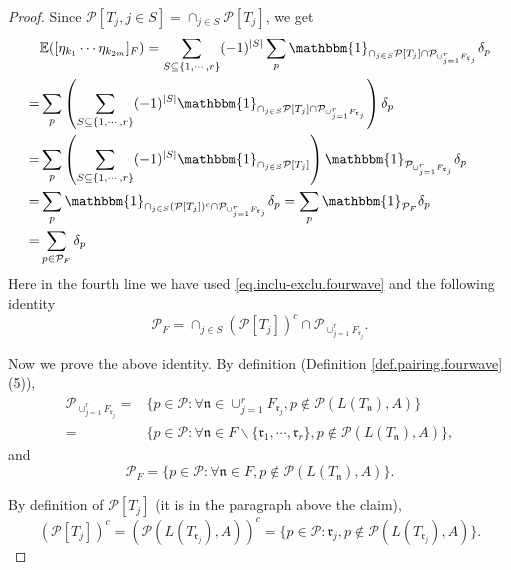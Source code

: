 \begin{proof}
 
 Since $\mathcal{P}[T_j,j\in S]=\cap_{j\in S}\mathcal{P}[T_j]$, we get
 \begin{equation}
  \begin{split}
  &\mathbb{E}([\eta_{k_1}\cdots \eta_{k_{2m}}]_F)=\sum_{S\subseteq\{1,\cdots,r\}}(-1)^{|S|}\sum_{p} \mathbbm{1}_{\cap_{j\in S}\mathcal{P}[T_j]\cap \mathcal{P}_{\cup_{j=1}^r F_{\mathfrak{r}_{j}}}} 
  \delta_p
  \\
  =&\sum_{p} \left(\sum_{S\subseteq\{1,\cdots,r\}}(-1)^{|S|}\mathbbm{1}_{\cap_{j\in S}\mathcal{P}[T_j]\cap \mathcal{P}_{\cup_{j=1}^r F_{\mathfrak{r}_{j}}}} \right)\delta_p 
  \\
  =& \sum_{p} \left(\sum_{S\subseteq\{1,\cdots,r\}}(-1)^{|S|}\mathbbm{1}_{\cap_{j\in S}\mathcal{P}[T_j]} \right)\mathbbm{1}_{ \mathcal{P}_{\cup_{j=1}^r F_{\mathfrak{r}_{j}}}}\delta_p
  \\
  =&\sum_{p} \mathbbm{1}_{\cap_{j\in S}(\mathcal{P}[T_j])^c\cap \mathcal{P}_{\cup_{j=1}^r F_{\mathfrak{r}_{j}}}} 
  \delta_p=\sum_{p} \mathbbm{1}_{\mathcal{P}_F} 
  \delta_p
  \\
  =&\sum_{p\in \mathcal{P}_F} \delta_p
  \end{split}
 \end{equation}
 Here in the fourth line we have used \eqref{eq.inclu-exclu.fourwave} and the following identity
 \begin{equation}\label{eq.lemrenorm5.fourwave}
  \mathcal{P}_F = \cap_{j\in S}(\mathcal{P}[T_j])^c\cap \mathcal{P}_{\cup_{j=1}^r F_{\mathfrak{r}_{j}}}.
 \end{equation}
 
 Now we prove the above identity. By definition (Definition \ref{def.pairing.fourwave} (5)), 
 \begin{equation}
  \begin{split}
  \mathcal{P}_{\cup_{j=1}^r F_{\mathfrak{r}_{j}}}=&\{p\in\mathcal{P}:\forall \mathfrak{n}\in \cup_{j=1}^r F_{\mathfrak{r}_{j}},p\notin \mathcal{P}(L(T_{\mathfrak{n}}),A)\}
  \\
  =&\{p\in\mathcal{P}:\forall \mathfrak{n}\in F\backslash \{\mathfrak{r}_1,\cdots,\mathfrak{r}_r\},p\notin \mathcal{P}(L(T_{\mathfrak{n}}),A)\},
  \end{split}
 \end{equation}
 and 
 \begin{equation}
  \mathcal{P}_F=\{p\in\mathcal{P}:\forall \mathfrak{n}\in F,p\notin \mathcal{P}(L(T_{\mathfrak{n}}),A)\}.
 \end{equation}
 
 By definition of $\mathcal{P}[T_j]$ (it is in the paragraph above the claim), 
 \begin{equation}
  (\mathcal{P}[T_j])^c = (\mathcal{P}(L(T_{\mathfrak{r}_j}),A))^c = \{p\in\mathcal{P}:\mathfrak{r}_j,p\notin \mathcal{P}(L(T_{\mathfrak{r}_j}),A)\}.
 \end{equation}
 

\end{proof}
